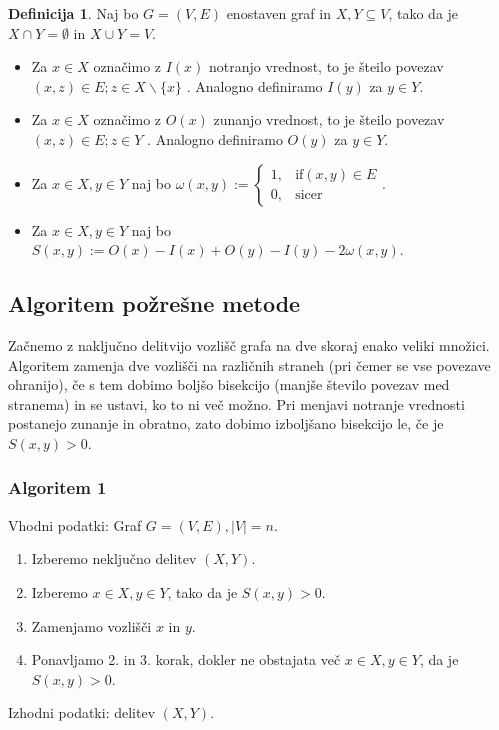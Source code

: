 \documentclass[12pt,a4paper]{amsart}
\theoremstyle{definition} %
\newtheorem{definicija}{Definicija}[section]
\theoremstyle{plain} %
\begin{document}
\begin{definicija}
Naj bo $G=(V,E)$ enostaven graf in $X,Y \subseteq V$, tako da je $X \cap Y = \emptyset$ in $X \cup Y =V$.
\begin{itemize}
\item Za $x \in X$ označimo z $I(x)$ notranjo vrednost, to je šteilo povezav $(x,z) \in E;z\in X \backslash \{x\}$ . Analogno definiramo $I(y)$ za $y \in Y$.
\item Za $x \in X$ označimo z $O(x)$ zunanjo vrednost, to je šteilo povezav $(x,z) \in E;z\in Y $ . Analogno definiramo $O(y)$ za $y \in Y$.
\item Za $x \in X, y \in Y$ naj bo $\omega(x,y) := \begin{cases} 1,&\text{if} (x,y) \in E\\ 
0, &\text{sicer}\end{cases} $.
\item Za $x \in X, y \in Y$ naj bo $S(x,y):= O(x)-I(x)+O(y)-I(y)-2\omega(x,y)$.
\end{itemize}
\end{definicija}

\subsection{Algoritem požrešne metode}
Začnemo z naključno delitvijo vozlišč grafa na dve skoraj enako veliki množici. Algoritem zamenja dve vozlišči na različnih straneh (pri čemer se vse povezave ohranijo), če s tem dobimo boljšo bisekcijo (manjše število povezav med stranema) in se ustavi, ko to ni več možno. Pri menjavi notranje vrednosti postanejo zunanje in obratno, zato dobimo izboljšano bisekcijo le, če je $S(x,y)>0$.
\subsubsection{Algoritem 1} 
Vhodni podatki: Graf $G=(V,E), |V|=n$.
\begin{enumerate}
\item Izberemo neključno delitev $(X,Y)$.
\item Izberemo $x\in X, y\in Y$, tako da je $S(x,y)>0$.
\item Zamenjamo vozlišči $x$ in $y$.
\item Ponavljamo 2. in 3. korak, dokler ne obstajata več $x\in X, y\in Y$, da je $S(x,y)>0$.
\end{enumerate}
Izhodni podatki: delitev $(X,Y)$.
\end{document}
